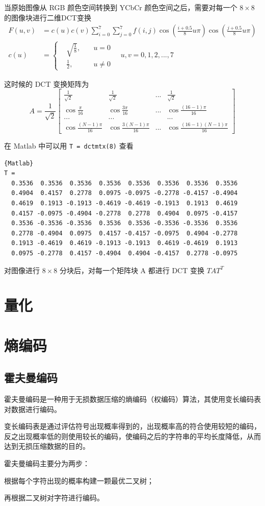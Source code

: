 当原始图像从 RGB 颜色空间转换到 YCbCr 颜色空间之后，需要对每一个 $8 \times 8$ 的图像块进行二维DCT变换
\begin{equation}
    \begin{aligned}
        F(u,v) &=c(u)c(v) \sum_{i=0}^{7} \sum_{j=0}^{7} f(i,j) \cos(\frac{i+0.5}{8}u\pi) \cos(\frac{j+0.5}{8}u\pi) \\
        c(u) &=\left\{\begin{aligned}
            & \sqrt{\frac{1}{8}},   & \quad u=0 \\
            & \frac{1}{2},          & \quad u\neq 0
        \end{aligned}\right.
        \quad u,v=0,1,2,...,7
    \end{aligned}
\end{equation}

这时候的 DCT 变换矩阵为
\begin{equation}
    A=\frac{1}{\sqrt{2}}
    \begin{bmatrix}
        \frac{1}{\sqrt{2}}      & \frac{1}{\sqrt{2}}        & ...   & \frac{1}{\sqrt{2}} \\
        \cos\frac{\pi}{16}      & \cos\frac{3\pi}{16}       & ...   & \cos\frac{(16-1)\pi}{16} \\
        ...                     & ...                       &       & ... \\
        \cos\frac{(N-1)\pi}{16} & \cos\frac{3(N-1)\pi}{16}  & ...   & \cos\frac{(16-1)(N-1)\pi}{16}
    \end{bmatrix}
\end{equation}

在 Matlab 中可以用 \lstinline|T = dctmtx(8)| 查看
\begin{lstlisting}{Matlab}
T =
  0.3536  0.3536  0.3536  0.3536  0.3536  0.3536  0.3536  0.3536
  0.4904  0.4157  0.2778  0.0975 -0.0975 -0.2778 -0.4157 -0.4904
  0.4619  0.1913 -0.1913 -0.4619 -0.4619 -0.1913  0.1913  0.4619
  0.4157 -0.0975 -0.4904 -0.2778  0.2778  0.4904  0.0975 -0.4157
  0.3536 -0.3536 -0.3536  0.3536  0.3536 -0.3536 -0.3536  0.3536
  0.2778 -0.4904  0.0975  0.4157 -0.4157 -0.0975  0.4904 -0.2778
  0.1913 -0.4619  0.4619 -0.1913 -0.1913  0.4619 -0.4619  0.1913
  0.0975 -0.2778  0.4157 -0.4904  0.4904 -0.4157  0.2778 -0.0975
\end{lstlisting}

对图像进行 $8\times 8$ 分块后，对每一个矩阵块 A 都进行 DCT 变换 $TAT^T$ 

\section{量化}
\section{熵编码}
\subsection{霍夫曼编码}
霍夫曼编码是一种用于无损数据压缩的熵编码（权编码）算法，其使用变长编码表对数据进行编码。

变长编码表是通过评估符号出现概率得到的，出现概率高的符合使用较短的编码，反之出现概率低的则使用较长的编码，使编码之后的字符串的平均长度降低，从而达到无损压缩数据的目的。

霍夫曼编码主要分为两步：

根据每个字符出现的概率构建一颗最优二叉树；

再根据二叉树对字符进行编码。
